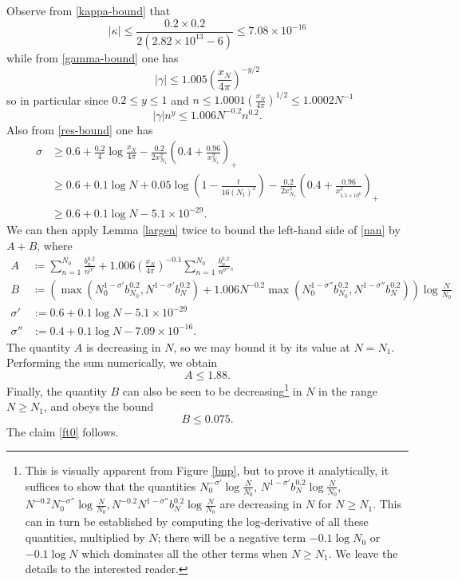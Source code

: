 Observe from \eqref{kappa-bound} that
$$ |\kappa| \leq \frac{0.2 \times 0.2}{2(2.82 \times 10^{13}-6)} \leq 7.08 \times 10^{-16}$$
while from \eqref{gamma-bound} one has
$$
|\gamma| \leq 1.005 \left( \frac{x_N}{4\pi} \right)^{-y/2}$$
so in particular since $0.2 \leq y \leq 1$ and $n \leq 1.0001 (\frac{x_N}{4\pi})^{1/2} \leq 1.0002 N^{-1}$
$$
|\gamma| n^y \leq 1.006 N^{-0.2} n^{0.2}.$$
Also from \eqref{res-bound} one has
\begin{align*}
\sigma &\geq 0.6 + \frac{0.2}{4} \log \frac{x_N}{4\pi} - \frac{0.2}{2x_{N_1}^2} \left(0.4+\frac{0.96}{x_{N_1}^2}\right)_+ \\
&\geq 0.6 + 0.1 \log N + 0.05 \log \left(1 - \frac{t}{16 (N_1)^2}\right) - \frac{0.2}{2x_{N_1}^2} \left(0.4+\frac{0.96}{x_{1.5\times 10^6}^2}\right)_+ \\
&\geq 0.6 + 0.1 \log N - 5.1 \times 10^{-29}.
\end{align*}
We can then apply Lemma \ref{largen} twice to bound the left-hand side of \eqref{nan} by $A+B$, where
\begin{align*}
A &\coloneqq \sum_{n=1}^{N_0} \frac{b_n^{0.2}}{n^{\sigma'}} + 1.006 \left( \frac{x_N}{4\pi} \right)^{-0.1} \sum_{n=1}^{N_0} \frac{b_n^{0.2}}{n^{\sigma''}}, \\
B &\coloneqq (\max( N_0^{1-\sigma'} b_{N_0}^{0.2}, N^{1-\sigma'} b_N^{0.2} ) + 1.006 N^{-0.2} 
\max( N_0^{1-\sigma''} b_{N_0}^{0.2}, N^{1-\sigma''} b_N^{0.2} ) )\log \frac{N}{N_0} \\
\sigma' &:= 0.6 + 0.1 \log N - 5.1 \times 10^{-29} \\
\sigma'' &:= 0.4 + 0.1 \log N - 7.09 \times 10^{-16}.
\end{align*}
The quantity $A$ is decreasing in $N$, so we may bound it by its value at $N = N_1$.  Performing the sum numerically, we obtain
$$ A \leq 1.88.$$
Finally, the quantity $B$ can also be seen to be decreasing\footnote{This is visually apparent from Figure \ref{bnp}, but to prove it analytically, it suffices to show that the quantities $N_0^{-\sigma'} \log \frac{N}{N_0}$, $N^{1-\sigma'} b_N^{0.2} \log \frac{N}{N_0}$, $N^{-0.2} N_0^{-\sigma''} \log \frac{N}{N_0}, N^{-0.2} N^{1-\sigma''} b_N^{0.2} \log \frac{N}{N_0}$ are decreasing in $N$ for $N \geq N_1$.  This can in turn be established by computing the log-derivative of all these quantities, multiplied by $N$; there will be a negative term $-0.1 \log N_0$ or $-0.1 \log N$ which dominates all the other terms when $N \geq N_1$.  We leave the details to the interested reader.}  in $N$ in the range $N \geq N_1$, and obeys the bound
$$ B \leq 0.075.$$
The claim \eqref{ft0} follows.

